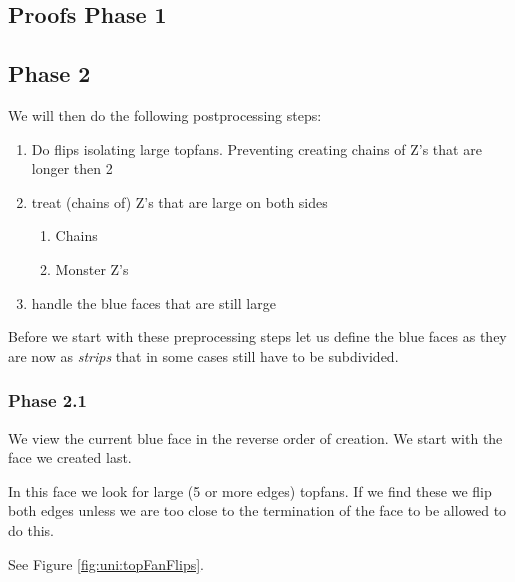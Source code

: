 \subsection{Proofs Phase 1}

\subsection{Phase 2}
We will then do the following postprocessing steps:

\begin{enumerate}
  \item Do flips isolating large topfans. Preventing creating chains of Z's that are longer then 2
  \item treat (chains of) Z's that are large on both sides
  \begin{enumerate}
    \item Chains
    \item Monster Z's
  \end{enumerate}
  \item handle the blue faces that are still large
\end{enumerate}

Before we start with these preprocessing steps let us define the blue faces as they are now as \emph{strips} that in some cases still have to be subdivided.

\subsubsection{Phase 2.1}
We view the current blue face in the reverse order of creation. We start with the face we created last.

In this face we look for large (5 or more edges) topfans. If we find these we flip both edges unless we are too close to the termination of the face to be allowed to do this.

See Figure \ref{fig:uni:topFanFlips}.

